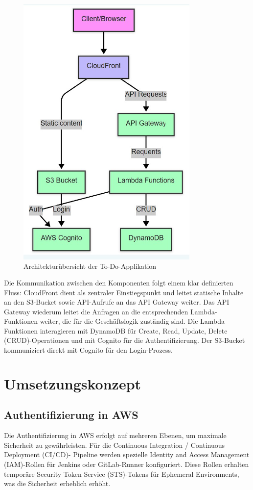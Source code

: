 \begin{figure}[h!]
\centering
\includegraphics[width=0.8\textwidth]{fig/mermaidflowChart.jpg}
\caption{Architekturübersicht der To-Do-Applikation}
\label{fig:architektur}
\end{figure}

Die Kommunikation zwischen den Komponenten folgt einem klar definierten
Fluss: CloudFront dient als zentraler Einstiegspunkt und leitet statische
Inhalte an den S3-Bucket sowie API-Aufrufe an das API Gateway weiter. Das API
Gateway wiederum leitet die Anfragen an die entsprechenden Lambda-Funktionen
weiter, die für die Geschäftslogik zuständig sind. Die Lambda-Funktionen
interagieren mit DynamoDB für Create, Read, Update, Delete (CRUD)-Operationen
und mit Cognito für die Authentifizierung. Der S3-Bucket kommuniziert direkt 
mit Cognito für den Login-Prozess.

\section{Umsetzungskonzept}
\subsection{Authentifizierung in AWS}
Die Authentifizierung in AWS erfolgt auf mehreren Ebenen, um maximale Sicherheit
zu gewährleisten. Für die Continuous Integration / Continuous Deployment (CI/CD)-
Pipeline werden spezielle Identity and Access Management (IAM)-Rollen für
Jenkins oder GitLab-Runner konfiguriert. Diese Rollen erhalten temporäre
Security Token Service (STS)-Tokens für Ephemeral Environments,
was die Sicherheit erheblich erhöht.

